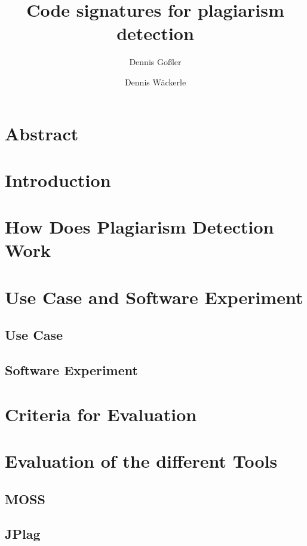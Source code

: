 \documentclass[a4paper, 11pt]{article}
\renewcommand{\\}{\vspace*{0.5\baselineskip} \newline}
\begin{document}
\title{Code signatures for plagiarism detection}
\author{Dennis Goßler \and Dennis Wäckerle}
\maketitle

\section*{Abstract}
\newpage
\tableofcontents
\newpage

\section{Introduction}

\section{How Does Plagiarism Detection Work}

\section{Use Case and Software Experiment}

\subsection{Use Case}

\subsection{Software Experiment}

\section{Criteria for Evaluation}

\section{Evaluation of the different Tools}

\subsection{MOSS}

\subsection{JPlag}
\end{document}
